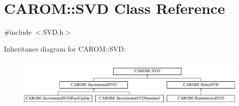 \hypertarget{class_c_a_r_o_m_1_1_s_v_d}{\section{C\-A\-R\-O\-M\-:\-:S\-V\-D Class Reference}
\label{class_c_a_r_o_m_1_1_s_v_d}
}


{\ttfamily \#include $<$S\-V\-D.\-h$>$}

Inheritance diagram for C\-A\-R\-O\-M\-:\-:S\-V\-D\-:\begin{figure}[H]
\begin{center}
\leavevmode
\includegraphics[height=2.466960cm]{class_c_a_r_o_m_1_1_s_v_d}
\end{center}
\end{figure}
